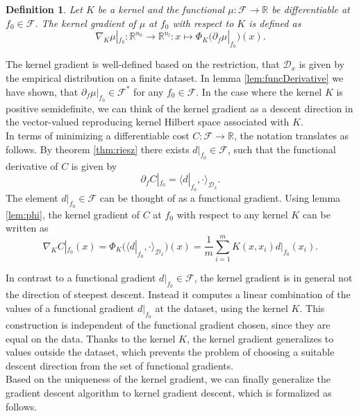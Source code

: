 \documentclass[11pt, a4paper]{article}
\newtheorem{definition}[theorem]{Definition}
\newcommand{\R}{\mathbb{R}}
\newcommand{\D}{\mathcal{D}}
\newcommand{\F}{\mathcal{F}}
\begin{document}
\begin{definition}
Let $K$ be a kernel and the functional $\mu : \F \to \R$ be differentiable at $f_0 \in \F$. The kernel gradient of $\mu$ at $f_0$ with respect to $K$ is defined as
\[ \nabla_K\mu|_{f_0}: \R^{n_0} \to \R^{n_l} : x \mapsto \Phi_K \Big ( \partial_f\mu|_{f_0} \Big )(x). \]
\end{definition}

The kernel gradient is well-defined based on the restriction, that $\D_x$ is given by the empirical distribution on a finite dataset. In lemma \ref{lem:funcDerivative} we have shown, that  $\partial_f \mu |_{f_0} \in \F^*$ for any $f_0 \in \F$. In the case where the kernel $K$ is positive semidefinite, we can think of the kernel gradient as a descent direction in the vector-valued reproducing kernel Hilbert space associated with $K$. \\

In terms of minimizing a differentiable cost $C: \F \to \R$, the notation translates as follows. By theorem \ref{thm:riesz} there exists $d|_{f_0} \in \F$, such that the functional derivative of $C$ is given by
\[ \partial_{f} C |_{f_0} = \big \langle d|_{f_0}, \cdot \big \rangle_{\D_x}. \]
The element $d|_{f_0} \in \F$ can be thought of as a functional gradient. Using lemma \ref{lem:phi}, the kernel gradient of $C$ at $f_0$ with respect to any kernel $K$ can be written as
\[ \nabla_KC|_{f_0}(x) = \Phi_K \Big ( \big \langle d|_{f_0} , \cdot \big \rangle_{\D_x} \Big )(x) = \frac{1}{m} \sum_{i=1}^{m} K(x,x_i)d|_{f_0}(x_i). \]

In contrast to a functional gradient $d|_{f_0} \in \F$, the kernel gradient is in general not the direction of steepest descent. Instead it computes a linear combination of the values of a functional gradient $d|_{f_0}$ at the dataset, using the kernel $K$. This construction is independent of the functional gradient chosen, since they are equal on the data. Thanks to the kernel $K$, the kernel gradient generalizes to values outside the dataset, which prevents the problem of choosing a suitable descent direction from the set of functional gradients. \\

Based on the uniqueness of the kernel gradient, we can finally generalize the gradient descent algorithm to kernel gradient descent, which is formalized as follows.
\end{document}
